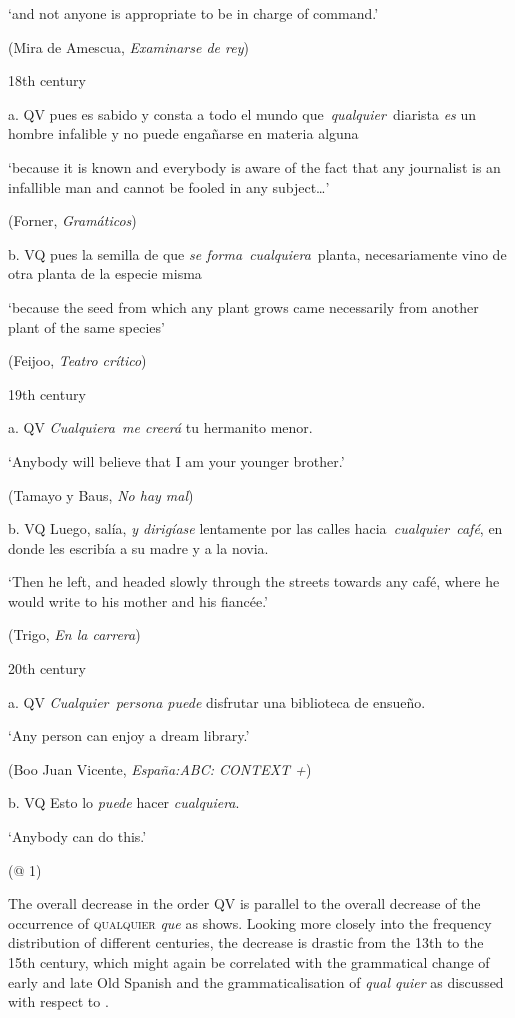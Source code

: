 \documentclass[output=paper]{langscibook}
\begin{document}
      ‘and not anyone is appropriate to be in charge of command.’

      (Mira de Amescua, \textit{Examinarse de rey})

  18th century

  a.  QV  pues es sabido y consta a todo el mundo que~\textit{qualquier}~diarista \textit{es} un hombre infalible y no puede engañarse en materia alguna 

      ‘because it is known and everybody is aware of the fact that any journalist is an infallible man and cannot be fooled in any subject…’

      (Forner, \textit{Gramáticos})

  b.  VQ  pues la semilla de que \textit{se forma}~\textit{cualquiera}~planta, necesariamente vino de otra planta de la especie misma 

      ‘because the seed from which any plant grows came necessarily from another plant of the same species’

      (Feijoo, \textit{Teatro crítico})

  19th century

  a.  QV  \textit{Cualquiera~me creerá} tu hermanito menor. 

      ‘Anybody will believe that I am your younger brother.’

      (Tamayo y Baus, \textit{No hay mal})

  b.  VQ  Luego, salía, \textit{y dirigíase} lentamente por las calles hacia\textit{~cualquier~café}, en donde les escribía a su madre y a la novia. 

      ‘Then he left, and headed slowly through the streets towards any café, where he would write to his mother and his fiancée.’

      (Trigo, \textit{En la carrera})

  20th century

  a.  QV  \textit{Cualquier~persona puede} disfrutar una biblioteca de ensueño.

      ‘Any person can enjoy a dream library.’

      (Boo Juan Vicente, \textit{España:ABC: CONTEXT +})

  b.  VQ  Esto lo \textit{puede} hacer \textit{cualquiera}. 

       ‘Anybody can do this.’

      (@ 1)

The overall decrease in the order QV is parallel to the overall decrease of the occurrence of \textsc{qualquier} \textit{que} as  shows. Looking more closely into the frequency distribution of different centuries, the decrease is drastic from the 13th to the 15th century, which might again be correlated with the grammatical change of early and late Old Spanish and the grammaticalisation of \textit{qual quier} as discussed with respect to .
\end{document}

